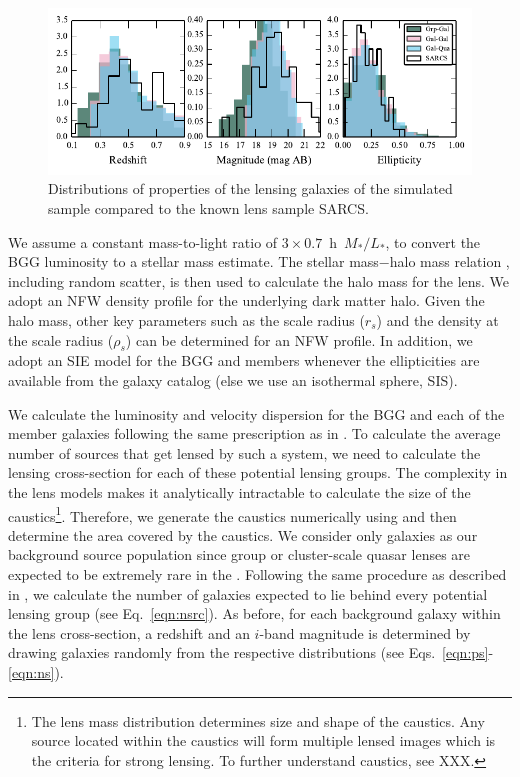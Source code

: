 \documentclass[useAMS,usenatbib,a4paper]{mn2e}
\begin{document}
\begin{figure}
\begin{center}
\includegraphics[scale=1.3]{sw-cfhtls-figs/lensprop.pdf}
\caption{ \label{fig:lensprop}
Distributions of properties of the lensing galaxies of the simulated
sample compared to the known lens sample SARCS. %
}
\end{center}
\end{figure}

We assume a constant mass-to-light ratio of $3 \times
0.7$~h~$M_{*}/L_{*}$, to convert the BGG luminosity to a stellar mass
estimate. The stellar mass$-$halo mass relation \citep{Behroozi2013},
including random scatter, is then used to calculate the halo mass for
the lens. We adopt an NFW \citep{Navarro1997} density profile for the
underlying dark matter halo. Given the halo mass, other key parameters
such as the scale radius ($r_s$) and the density at the scale radius
($\rho_s$) can be determined for an NFW profile. In addition, we adopt
an SIE model for the BGG and members whenever the ellipticities are
available from the galaxy catalog (else we use an isothermal sphere,
SIS).

We calculate the luminosity and velocity dispersion for the BGG and each of the
member galaxies following the same prescription as in
. To calculate the average number of sources that get
lensed by such a system, we need to calculate the lensing cross-section for each
of these potential lensing groups. The complexity in the lens models makes it
analytically intractable to calculate the size of the caustics\footnote{The lens
mass distribution determines size and shape of the caustics. Any source
located within the caustics will form multiple lensed images which is the
criteria for strong lensing. To further understand caustics, see XXX.}.
Therefore, we generate the caustics numerically using \gravlens and then
determine the area covered by the caustics. We consider only galaxies as our
background source population since group or cluster-scale quasar lenses are
expected to be extremely rare in the \cfhtls.  Following the same procedure
as described in , we calculate the number of galaxies
expected to lie behind every potential lensing group (see Eq.~\ref{eqn:nsrc}).
As before, for each background galaxy within the lens cross-section, a redshift
and an $i$-band magnitude is determined by drawing galaxies randomly from the
respective distributions (see Eqs.~\ref{eqn:ps}-\ref{eqn:ns}).
\end{document}
